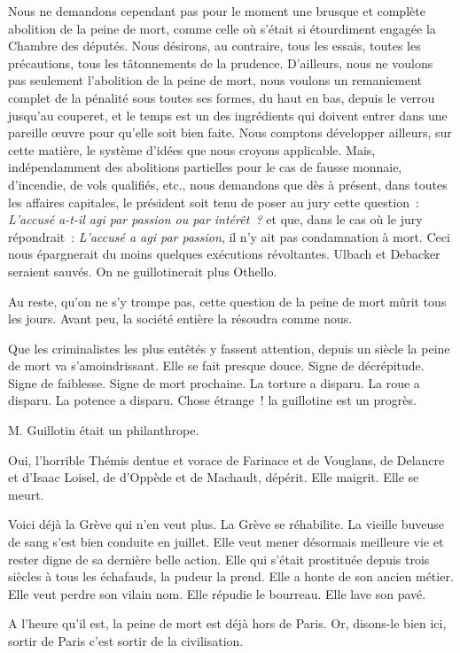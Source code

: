 \documentclass[french,twoside]{book} %
\begin{document}
Nous ne demandons cependant pas pour le moment une brusque et complète abolition de la peine de mort, comme celle où s’était si étourdiment engagée la Chambre des députés. Nous désirons, au contraire, tous les essais, toutes les précautions, tous les tâtonnements de la prudence. D’ailleurs, nous ne voulons pas seulement l’abolition de la peine de mort, nous voulons un remaniement complet de la pénalité sous toutes ses formes, du haut en bas, depuis le verrou jusqu’au couperet, et le temps est un des ingrédients qui doivent entrer dans une pareille œuvre pour qu’elle soit bien faite. Nous comptons développer ailleurs, sur cette matière, le système d’idées que nous croyons applicable. Mais, indépendamment des abolitions partielles pour le cas de fausse monnaie, d’incendie, de vols qualifiés, etc., nous demandons que dès à présent, dans toutes les affaires capitales, le président soit tenu de poser au jury cette question : \emph{L’accusé a-t-il agi par passion ou par intérêt ?} et que, dans le cas où le jury répondrait : \emph{L’accusé a agi par passion}, il n’y ait pas condamnation à mort. Ceci nous épargnerait du moins quelques exécutions révoltantes. Ulbach et Debacker seraient sauvés. On ne guillotinerait plus Othello.\par
 Au reste, qu’on ne s’y trompe pas, cette question de la peine de mort mûrit tous les jours. Avant peu, la société entière la résoudra comme nous.\par
Que les criminalistes les plus entêtés y fassent attention, depuis un siècle la peine de mort va s’amoindrissant. Elle se fait presque douce. Signe de décrépitude. Signe de faiblesse. Signe de mort prochaine. La torture a disparu. La roue a disparu. La potence a disparu. Chose étrange ! la guillotine est un progrès.\par
M. Guillotin était un philanthrope.\par
Oui, l’horrible Thémis dentue et vorace de Farinace et de Vouglans, de Delancre et d’Isaac Loisel, de d’Oppède et de Machault, dépérit. Elle maigrit. Elle se meurt.\par
Voici déjà la Grève qui n’en veut plus. La Grève se réhabilite. La vieille buveuse de sang s’est bien conduite en juillet. Elle veut mener désormais meilleure vie et rester digne de sa dernière belle action. Elle qui s’était prostituée depuis trois siècles à tous les échafauds, la pudeur la prend. Elle a honte de son ancien métier. Elle veut perdre son vilain nom. Elle répudie le bourreau. Elle lave son pavé.\par
A l’heure qu’il est, la peine de mort est déjà hors de Paris. Or, disons-le bien ici, sortir de Paris c’est sortir de la civilisation.\par
\end{document}
